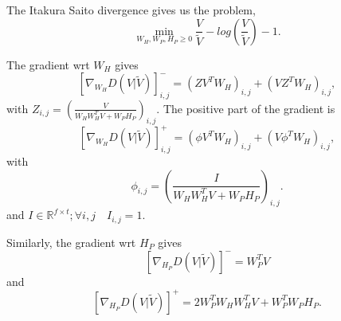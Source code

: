 \documentclass{article}
\begin{document}
The Itakura Saito divergence gives us the problem,
$$\min_{W_H,W_P,H_P \geq 0} \frac{V}{\tilde{V}} - log(\frac{V}{\tilde{V}}) -1.$$

The gradient wrt $W_H$ gives
$$[\nabla_{W_H} D(V|\tilde{V})]_{i,j}^{-} = (ZV^TW_H)_{i,j} + (VZ^TW_H)_{i,j},$$
with $Z_{i,j} = (\frac{V}{W_HW_H^TV + W_PH_P})_{i,j}$. 
The positive part of the gradient is
$$[\nabla_{W_H} D(V|\tilde{V})]_{i,j}^{+} = (\phi V^TW_H)_{i,j} + (V \phi^T W_H)_{i,j},$$
with \vspace{-0.2cm} $$ \phi_{i,j} = (\frac{I}{W_HW_H^TV + W_PH_P})_{i,j}.$$ and $I \in \mathbb{R}^{f \times t} ; \forall i,j \quad I_{i,j}=1$.

Similarly, the gradient wrt $H_P$ gives
$$ [\nabla_{H_P} D(V|\tilde{V})]^{-} = W_P^TV  $$
and \vspace{-0.2cm}
$$ [\nabla_{H_P} D(V|\tilde{V})]^{+} = 2W_P^TW_HW_H^TV + W_P^TW_PH_P. $$




\end{document}
